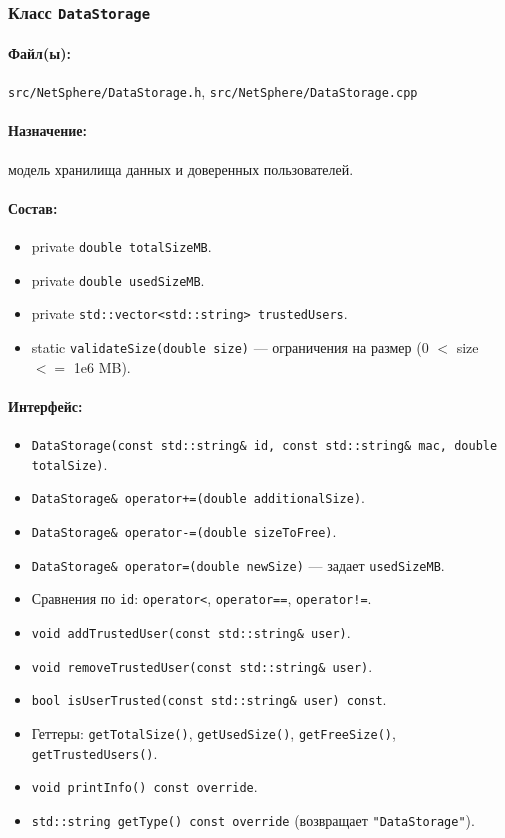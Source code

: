 \documentclass[14pt,a4paper]{extarticle}
\begin{document}
\subsubsection{Класс \texttt{DataStorage}}
\paragraph{Файл(ы):} \texttt{src/NetSphere/DataStorage.h}, \texttt{src/NetSphere/DataStorage.cpp}
\paragraph{Назначение:} модель хранилища данных и доверенных пользователей.
\paragraph{Состав:}
\begin{itemize}
  \item private \texttt{double totalSizeMB}.
  \item private \texttt{double usedSizeMB}.
  \item private \texttt{std::vector<std::string> trustedUsers}.
  \item static \texttt{validateSize(double size)} --- ограничения на размер (0 $<$ size $<=$ 1e6 MB).
\end{itemize}
\paragraph{Интерфейс:}
\begin{itemize}
  \item \texttt{DataStorage(const std::string\& id, const std::string\& mac, double totalSize)}.
  \item \texttt{DataStorage\& operator+=(double additionalSize)}.
  \item \texttt{DataStorage\& operator-=(double sizeToFree)}.
  \item \texttt{DataStorage\& operator=(double newSize)} --- задает \texttt{usedSizeMB}.
  \item Сравнения по \texttt{id}: \texttt{operator<}, \texttt{operator==}, \texttt{operator!=}.
  \item \texttt{void addTrustedUser(const std::string\& user)}.
  \item \texttt{void removeTrustedUser(const std::string\& user)}.
  \item \texttt{bool isUserTrusted(const std::string\& user) const}.
  \item Геттеры: \texttt{getTotalSize()}, \texttt{getUsedSize()}, \texttt{getFreeSize()}, \texttt{getTrustedUsers()}.
  \item \texttt{void printInfo() const override}.
  \item \texttt{std::string getType() const override} (возвращает \texttt{"DataStorage"}).
\end{itemize}
\end{document}
